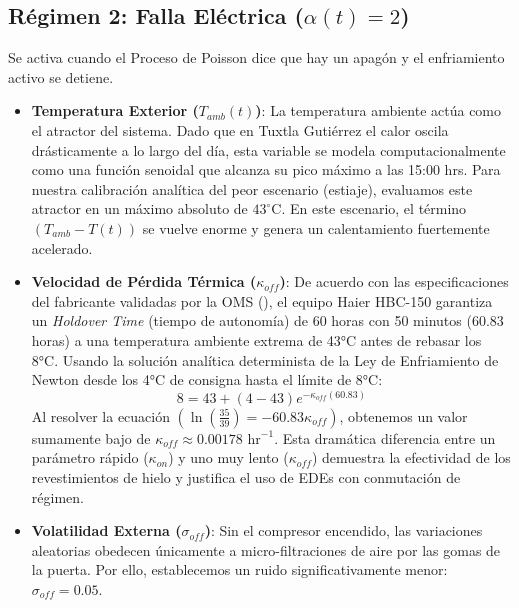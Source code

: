 \documentclass[
  spanish,
  letterpaper,
  DIV=11,
  numbers=noendperiod]{scrreprt}
\providecommand{\tightlist}{%
  \setlength{\itemsep}{0pt}\setlength{\parskip}{0pt}}
\theoremstyle{plain}
\theoremstyle{definition}
\theoremstyle{remark}
\begin{document}
\subsection{\texorpdfstring{Régimen 2: Falla Eléctrica
(\(\alpha(t) = 2\))}{Régimen 2: Falla Eléctrica (\textbackslash alpha(t) = 2)}}\label{sec-regimen-2}

Se activa cuando el Proceso de Poisson dice que hay un apagón y el
enfriamiento activo se detiene.

\begin{itemize}
\tightlist
\item
  \textbf{Temperatura Exterior (\(T_{amb}(t)\))}: La temperatura
  ambiente actúa como el atractor del sistema. Dado que en Tuxtla
  Gutiérrez el calor oscila drásticamente a lo largo del día, esta
  variable se modela computacionalmente como una función senoidal que
  alcanza su pico máximo a las 15:00 hrs. Para nuestra calibración
  analítica del peor escenario (estiaje), evaluamos este atractor en un
  máximo absoluto de \textbf{\(43^\circ \text{C}\)}. En este escenario,
  el término \((T_{amb} - T(t))\) se vuelve enorme y genera un
  calentamiento fuertemente acelerado.
\item
  \textbf{Velocidad de Pérdida Térmica (\(\kappa_{off}\))}: De acuerdo
  con las especificaciones del fabricante validadas por la OMS
  (),
  el equipo Haier HBC-150 garantiza un \emph{Holdover Time} (tiempo de
  autonomía) de 60 horas con 50 minutos (60.83 horas) a una temperatura
  ambiente extrema de 43°C antes de rebasar los 8°C. Usando la solución
  analítica determinista de la Ley de Enfriamiento de Newton desde los
  4°C de consigna hasta el límite de 8°C:
  \[8 = 43 + (4 - 43) e^{-\kappa_{off} (60.83)}\] Al resolver la
  ecuación
  \(\left(\ln\left(\frac{35}{39}\right) = -60.83 \kappa_{off}\right)\),
  obtenemos un valor sumamente bajo de
  \(\kappa_{off} \approx 0.00178 \text{ hr}^{-1}\). Esta dramática
  diferencia entre un parámetro rápido (\(\kappa_{on}\)) y uno muy lento
  (\(\kappa_{off}\)) demuestra la efectividad de los revestimientos de
  hielo y justifica el uso de EDEs con conmutación de régimen.
\item
  \textbf{Volatilidad Externa (\(\sigma_{off}\))}: Sin el compresor
  encendido, las variaciones aleatorias obedecen únicamente a
  micro-filtraciones de aire por las gomas de la puerta. Por ello,
  establecemos un ruido significativamente menor:
  \(\sigma_{off} = 0.05\).
\end{itemize}
\end{document}
